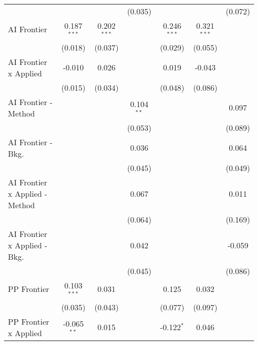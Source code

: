 \begin{tabular}{lcccccc}
                                  &                &                & (0.035)        &                &                & (0.072)\\   
   AI Frontier                    & 0.187$^{***}$  & 0.202$^{***}$  &                & 0.246$^{***}$  & 0.321$^{***}$  &   \\   
                                  & (0.018)        & (0.037)        &                & (0.029)        & (0.055)        &   \\   
   AI Frontier x Applied          & -0.010         & 0.026          &                & 0.019          & -0.043         &   \\   
                                  & (0.015)        & (0.034)        &                & (0.048)        & (0.086)        &   \\   
   AI Frontier - Method           &                &                & 0.104$^{**}$   &                &                & 0.097\\   
                                  &                &                & (0.053)        &                &                & (0.089)\\   
   AI Frontier - Bkg.             &                &                & 0.036          &                &                & 0.064\\   
                                  &                &                & (0.045)        &                &                & (0.049)\\   
   AI Frontier x Applied - Method &                &                & 0.067          &                &                & 0.011\\   
                                  &                &                & (0.064)        &                &                & (0.169)\\   
   AI Frontier x Applied - Bkg.   &                &                & 0.042          &                &                & -0.059\\   
                                  &                &                & (0.045)        &                &                & (0.086)\\   
   PP Frontier                    & 0.103$^{***}$  & 0.031          &                & 0.125          & 0.032          &   \\   
                                  & (0.035)        & (0.043)        &                & (0.077)        & (0.097)        &   \\   
   PP Frontier x Applied          & -0.065$^{**}$  & 0.015          &                & -0.122$^{*}$   & 0.046          &   \\   

\end{tabular}
